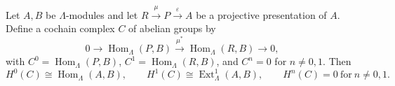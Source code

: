 Let $A, B$ be $\Lambda$-modules and let $R \xrightarrow{\mu} P \xrightarrow{\varepsilon} A$ be a projective presentation of $A$. Define a cochain complex $C$ of abelian groups by
$$
0 \longrightarrow \operatorname{Hom}_\Lambda(P, B) \xrightarrow{\mu^*} \operatorname{Hom}_\Lambda(R, B) \longrightarrow 0,
$$
with $C^0 = \operatorname{Hom}_\Lambda(P, B)$, $C^1 = \operatorname{Hom}_\Lambda(R, B)$, and $C^n = 0$ for $n \neq 0, 1$. Then
$$
H^0(C) \cong \operatorname{Hom}_\Lambda(A, B), \qquad
H^1(C) \cong \operatorname{Ext}_\Lambda^1(A, B), \qquad
H^n(C) = 0 \ \text{for}\ n \neq 0, 1.
$$
